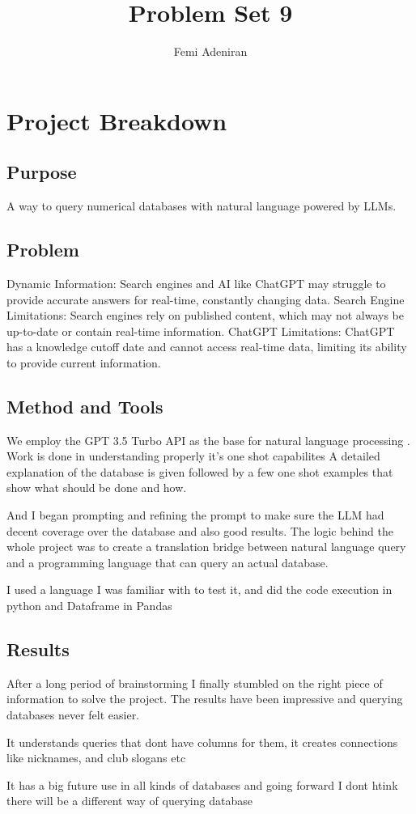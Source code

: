 \documentclass{article}
\title{Problem Set 9}
\author{Femi Adeniran}
\begin{document}
\maketitle

\begin{abstract}

\end{abstract}

\section{Project Breakdown}
\subsection{Purpose}
A way to query numerical databases with natural language powered by LLMs. 
\subsection{Problem}

Dynamic Information: Search engines and AI like ChatGPT may struggle to provide accurate answers for real-time, constantly changing data.
Search Engine Limitations: Search engines rely on published content, which may not always be up-to-date or contain real-time information.
ChatGPT Limitations: ChatGPT has a knowledge cutoff date and cannot access real-time data, limiting its ability to provide current information.

\subsection{Method and Tools}
We employ the GPT 3.5 Turbo API as the base for natural language processing . Work is done in understanding properly it's one shot capabilites A detailed explanation of the database is given followed by a few one shot examples that show what should be done and how. 

And I began prompting and refining the prompt to make sure the LLM had decent coverage over the database and also good results.
The logic behind the whole project was to create a translation bridge between natural language query and a programming language that can query an actual database.

I used a language I was familiar with to test it, and did the code execution in python and Dataframe in Pandas

\subsection{Results}
After a long period of brainstorming I finally stumbled on the right piece of information to solve the project. The results have been impressive and querying databases never felt easier.

It understands queries that dont have columns for them, it creates connections like nicknames, and club slogans etc

It has a big future use in all kinds of databases and going forward I dont htink there will be a different way of querying database
\end{document}
